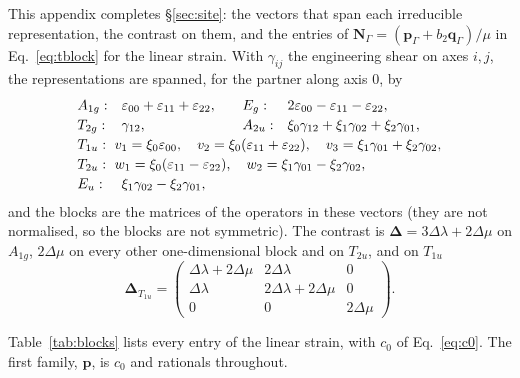 \documentclass[11pt,a4paper]{article}
\begin{document}
This appendix completes \S\ref{sec:site}: the vectors that span each irreducible representation, the
contrast on them, and the entries of $\mathbf{N}_\Gamma=(\mathbf{p}_\Gamma+b_2\mathbf{q}_\Gamma)/\mu$ in
Eq.~\eqref{eq:tblock} for the linear strain. With $\gamma_{ij}$ the
engineering shear on axes $i,j$, the representations are spanned, for the partner along axis $0$, by
\begin{equation*}
\begin{array}{@{}ll@{\qquad}ll@{}}
  A_{1g}: & \varepsilon_{00}+\varepsilon_{11}+\varepsilon_{22}, & E_g: & 2\varepsilon_{00}-\varepsilon_{11}-\varepsilon_{22},\\[2pt]
  T_{2g}: & \gamma_{12}, & A_{2u}: & \xi_0\gamma_{12}+\xi_1\gamma_{02}+\xi_2\gamma_{01},\\[2pt]
  T_{1u}: & \multicolumn{3}{@{}l@{}}{v_1=\xi_0\varepsilon_{00},\quad v_2=\xi_0(\varepsilon_{11}+\varepsilon_{22}),\quad
            v_3=\xi_1\gamma_{01}+\xi_2\gamma_{02},}\\[2pt]
  T_{2u}: & \multicolumn{3}{@{}l@{}}{w_1=\xi_0(\varepsilon_{11}-\varepsilon_{22}),\quad w_2=\xi_1\gamma_{01}-\xi_2\gamma_{02},}\\[2pt]
  E_u: & \xi_1\gamma_{02}-\xi_2\gamma_{01}, & &
\end{array}
\end{equation*}
and the blocks are the matrices of the operators in these vectors (they are not normalised, so the blocks
are not symmetric). The contrast is $\boldsymbol\Delta=3\Delta\lambda+2\Delta\mu$ on $A_{1g}$, $2\Delta\mu$
on every other one-dimensional block and on $T_{2u}$, and on $T_{1u}$
\begin{equation}
  \boldsymbol\Delta_{T_{1u}}=\begin{pmatrix}\Delta\lambda+2\Delta\mu&2\Delta\lambda&0\\
  \Delta\lambda&2\Delta\lambda+2\Delta\mu&0\\0&0&2\Delta\mu\end{pmatrix}.
\end{equation}

Table~\ref{tab:blocks} lists every entry of the linear strain, with $c_0$ of Eq.~\eqref{eq:c0}. The first
family, $\mathbf{p}$, is $c_0$ and rationals throughout.
\end{document}
